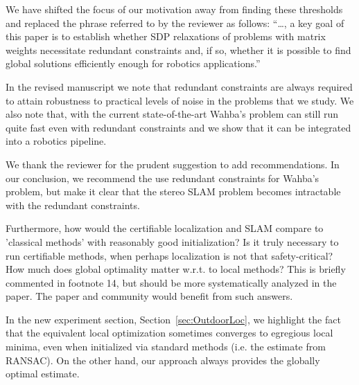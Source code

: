 \begin{response}
    We have shifted the focus of our motivation away from finding these thresholds and replaced the phrase referred to by the reviewer as follows:
    ``\ldots, a key goal of this paper is to establish whether SDP relaxations of problems with matrix weights necessitate redundant constraints and, if so, whether it is possible to find global solutions efficiently enough for robotics applications.''
    
    In the revised manuscript we note that redundant constraints are always required to attain robustness to practical levels of noise in the problems that we study. We also note that, with the current state-of-the-art Wahba's problem can still run quite fast even with redundant constraints and we show that it can be integrated into a robotics pipeline. 
    
    We thank the reviewer for the prudent suggestion to add recommendations. 
    In our conclusion, we recommend the use redundant constraints for Wahba's problem, but make it clear that the stereo SLAM problem becomes intractable with the redundant constraints. 

\end{response}

Furthermore, how would the certifiable localization and SLAM compare to 'classical methods' with reasonably good initialization? Is it truly necessary to run certifiable methods, when perhaps localization is not that safety-critical? How much does global optimality matter w.r.t. to local methods? This is briefly commented in footnote 14, but should be more systematically analyzed in the paper. The paper and community would benefit from such answers.
\begin{response}
    In the new experiment section, Section~\ref{sec:OutdoorLoc}, we highlight the fact that the equivalent local optimization sometimes converges to egregious local minima, even when initialized via standard methods (i.e. the estimate from RANSAC). On the other hand, our approach always provides the globally optimal estimate.
\end{response}

